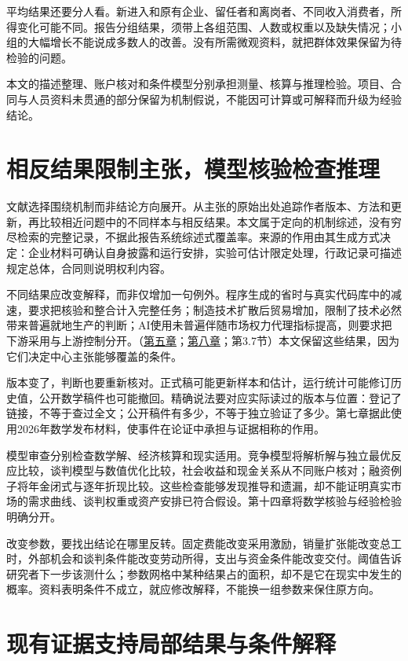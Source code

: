 \documentclass[UTF8,fontset=windows,12pt,a4paper,oneside,openany]{ctexbook}
\begin{document}
平均结果还要分人看。新进入和原有企业、留任者和离岗者、不同收入消费者，所得变化可能不同。报告分组结果，须带上各组范围、人数或权重以及缺失情况；小组的大幅增长不能说成多数人的改善。没有所需微观资料，就把群体效果保留为待检验的问题。

本文的描述整理、账户核对和条件模型分别承担测量、核算与推理检验。项目、合同与人员资料未贯通的部分保留为机制假说，不能因可计算或可解释而升级为经验结论。

\section{相反结果限制主张，模型核验检查推理}

文献选择围绕机制而非结论方向展开。从主张的原始出处追踪作者版本、方法和更新，再比较相近问题中的不同样本与相反结果。本文属于定向的机制综述，没有穷尽检索的完整记录，不据此报告系统综述式覆盖率。来源的作用由其生成方式决定：企业材料可确认自身披露和运行安排，实验可估计限定处理，行政记录可描述规定总体，合同则说明权利内容。

不同结果应改变解释，而非仅增加一句例外。程序生成的省时与真实代码库中的减速，要求把核验和整合计入完整任务；制造技术扩散后贸易增加，限制了技术必然带来普遍就地生产的判断；AI使用未普遍伴随市场权力代理指标提高，则要求把下游采用与上游控制分开。（\hyperref[ch:5]{第五章}；\hyperref[ch:8]{第八章}；第3.7节）本文保留这些结果，因为它们决定中心主张能够覆盖的条件。

版本变了，判断也要重新核对。正式稿可能更新样本和估计，运行统计可能修订历史值，公开数学稿件也可能撤回。精确说法要对应实际读过的版本与位置：登记了链接，不等于查过全文；公开稿件有多少，不等于独立验证了多少。第七章据此使用2026年数学发布材料，使事件在论证中承担与证据相称的作用。

模型审查分别检查数学解、经济核算和现实适用。竞争模型将解析解与独立最优反应比较，谈判模型与数值优化比较，社会收益和现金关系从不同账户核对；融资例子将年金闭式与逐年折现比较。这些检查能够发现推导和遗漏，却不能证明真实市场的需求曲线、谈判权重或资产安排已符合假设。第十四章将数学核验与经验检验明确分开。

改变参数，要找出结论在哪里反转。固定费能改变采用激励，销量扩张能改变总工时，外部机会和谈判条件能改变劳动所得，支出与资金条件能改变交付。阈值告诉研究者下一步该测什么；参数网格中某种结果占的面积，却不是它在现实中发生的概率。资料表明条件不成立，就应修改解释，不能换一组参数来保住原方向。

\section{现有证据支持局部结果与条件解释}
\end{document}

